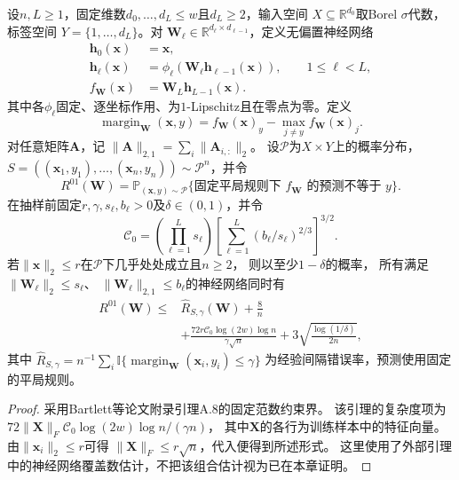 \begin{theorem}[深层神经网络的谱复杂度与期望风险]
\label{thm:spectral-network-risk}
设$n,L\geq1$，固定维数$d_0,\ldots,d_L\leq w$且$d_L\geq2$，输入空间
$X\subseteq\mathbb R^{d_0}$取Borel $\sigma$代数，标签空间
$Y=\{1,\ldots,d_L\}$。对
$\bm W_\ell\in\mathbb R^{d_\ell\times d_{\ell-1}}$，定义无偏置神经网络
\[
\begin{aligned}
 \bm h_0(\bm x)&=\bm x,\\
 \bm h_\ell(\bm x)
 &=\phi_\ell(\bm W_\ell\bm h_{\ell-1}(\bm x)),
 \qquad 1\leq\ell<L,\\
 f_{\bm W}(\bm x)&=\bm W_L\bm h_{L-1}(\bm x).
\end{aligned}
\]
其中各$\phi_\ell$固定、逐坐标作用、为$1$-Lipschitz且在零点为零。定义
\[
 \operatorname{margin}_{\bm W}(\bm x,y)
 =f_{\bm W}(\bm x)_y-\max_{j\neq y}f_{\bm W}(\bm x)_j.
\]
对任意矩阵$\bm A$，记
$\|\bm A\|_{2,1}=\sum_i\|\bm A_{i,:}\|_2$。
设$\mathcal P$为$X\times Y$上的概率分布，
$S=((\bm x_1,y_1),\ldots,(\bm x_n,y_n))\sim\mathcal P^n$，并令
\[
 R^{01}(\bm W)
 =\mathbb P_{(\bm x,y)\sim\mathcal P}
   \{\text{固定平局规则下 }f_{\bm W}\text{ 的预测不等于 }y\}.
\]
在抽样前固定$r,\gamma,s_\ell,b_\ell>0$及$\delta\in(0,1)$，并令
\[
 \mathcal C_0=
 \left(\prod_{\ell=1}^L s_\ell\right)
 \left[\sum_{\ell=1}^L(b_\ell/s_\ell)^{2/3}\right]^{3/2}.
\]
若$\|\bm x\|_2\leq r$在$\mathcal P$下几乎处处成立且$n\geq2$，
则以至少$1-\delta$的概率，
所有满足$\|\bm W_\ell\|_2\leq s_\ell$、
$\|\bm W_\ell\|_{2,1}\leq b_\ell$的神经网络同时有
\begin{equation}
 \begin{aligned}
 R^{01}(\bm W)\leq{}&\hat R_{S,\gamma}(\bm W)+\frac8n\\
 &+\frac{72r\mathcal C_0\log(2w)\log n}{\gamma\sqrt n}
 +3\sqrt{\frac{\log(1/\delta)}{2n}},
 \end{aligned}
 \label{eq:spectral-risk-explicit}
\end{equation}
其中
$\hat R_{S,\gamma}=n^{-1}\sum_i
\mathbb I\{\operatorname{margin}_{\bm W}(\bm x_i,y_i)\leq\gamma\}$
为经验间隔错误率，预测使用固定的平局规则。
\end{theorem}
\begin{proof}
采用Bartlett等论文附录引理A.8的固定范数约束界。
该引理的复杂度项为
$72\|\bm X\|_F\mathcal C_0\log(2w)\log n/(\gamma n)$，
其中$\bm X$的各行为训练样本中的特征向量。由$\|\bm x_i\|_2\leq r$可得
$\|\bm X\|_F\leq r\sqrt n$，代入便得到所述形式。
这里使用了外部引理中的神经网络覆盖数估计，不把该组合估计视为已在本章证明。
\end{proof}

